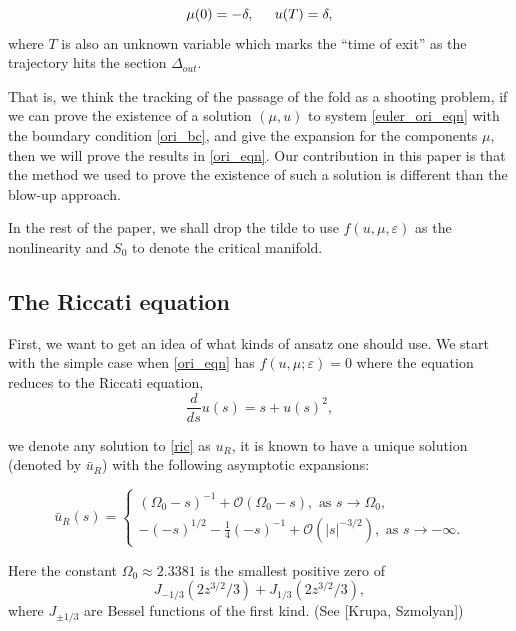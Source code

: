 \documentclass[letterpaper,11pt]{article}
\newcommand{\rmO}{\mathcal{O}}
\newcommand{\eps}{\varepsilon}
\numberwithin{equation}{section}
\theoremstyle{plain}
\begin{document}
\begin{equation}\label{ori_bc}
\mu(0) = -\delta, \hspace{0.2in} u(T) = \delta,
\end{equation}
where $T$ is also an unknown variable which marks the ``time of exit'' as the trajectory hits the section $\Delta_{out}$.

That is, we think the tracking of the passage of the fold as a shooting problem, if we can prove the existence of a solution $(\mu, u)$ to system \eqref{euler_ori_eqn} with the boundary condition \eqref{ori_bc}, and give the expansion for the components $\mu$, then we will prove the results in \eqref{ori_eqn}. Our contribution in this paper is that the method we used to prove the existence of such a solution is different than the blow-up approach.

In the rest of the paper, we shall drop the tilde to use $f(u,\mu,\eps)$ as the nonlinearity and $S_0$ to denote the critical manifold.



\subsection{The Riccati equation}\label{Ric_def}
First, we want to get an idea of what kinds of ansatz one should use. We start with the simple case when \eqref{ori_eqn} has $f(u,\mu;\eps) = 0$ where the equation reduces to the Riccati equation,
\begin{equation}\label{ric}
\frac{d}{ds}u(s) = s+u(s)^2,
\end{equation}

we denote any solution to \eqref{ric} as $u_R$, it is known to have a unique solution (denoted by $\bar{u}_R$) with the following asymptotic expansions:

\begin{equation} \label{ric_asy}
\bar{u}_R(s)=\begin{cases}
  (\Omega_0-s)^{-1}+\rmO(\Omega_0-s), \text{ as }s \to \Omega_0, \\
 -(-s)^{1/2} -\frac{1}{4}(-s)^{-1} + \rmO(|s|^{-3/2}), \text{ as }s \to -\infty.
\end{cases}
\end{equation}

Here the constant $\Omega_0 \approx 2.3381$ is the smallest positive zero of 
\[
J_{-1/3}(2z^{3/2}/3)+J_{1/3}(2z^{3/2}/3),
\]
where $J_{\pm 1/3}$ are Bessel functions of the first kind. (See [Krupa, Szmolyan])
\end{document}

